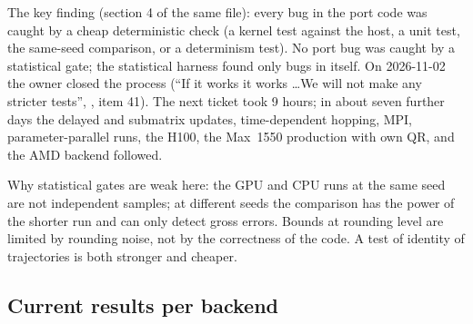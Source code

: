 The key finding (section 4 of the same file): every bug in the port code was caught by a cheap deterministic check (a kernel test against the host, a unit test, the same-seed comparison, or a determinism test). No port bug was caught by a statistical gate; the statistical harness found only bugs in itself. On 2026-11-02 the owner closed the process (``If it works it works \ldots We will not make any stricter tests'', , item 41). The next ticket took 9 hours; in about seven further days the delayed and submatrix updates, time-dependent hopping, MPI, parameter-parallel runs, the H100, the Max~1550 production with own QR, and the AMD backend followed.

Why statistical gates are weak here: the GPU and CPU runs at the same seed are not independent samples; at different seeds the comparison has the power of the shorter run and can only detect gross errors. Bounds at rounding level are limited by rounding noise, not by the correctness of the code. A test of identity of trajectories is both stronger and cheaper.

\subsection{Current results per backend}


